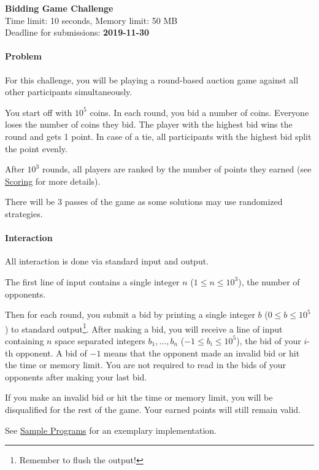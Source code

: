 \documentclass[
    a4paper,
    12pt,
    parskip=half,
    headings=standardclasses,
    footskip=0pt,
    footlines=1,
    headheight=80in
]{scrartcl}
\begin{document}
\begin{center}
    {\LARGE\textbf{Bidding Game Challenge}}\\[6pt]
    Time limit: 10 seconds, Memory limit: 50 MB\\
    {\small Deadline for submissions: \textbf{2019-11-30}}
\end{center}

\paragraph*{Problem}

For this challenge, you will be playing a round-based auction game against all
other participants simultaneously.

You start off with $10^5$ coins. In each round, you bid a number of coins. Everyone loses the number of coins they bid.
The player with the highest bid wins the round and gets 1 point. In case of a tie, all participants with the highest bid
split the point evenly.

After $10^3$ rounds, all players are ranked by the
number of points they earned (see \hyperref[scoring]{Scoring} for more details).

There will be 3 passes of the game as some solutions may use
randomized strategies.

\paragraph*{Interaction} All interaction is done via standard input and output.

The first line of input contains a single integer $n$ ($1 \leq n \leq 10^3$),
the number of opponents.

Then for each round, you submit a bid by printing a single integer $b$ ($0 \leq
    b \leq 10^5$) to standard output\footnote{Remember to flush the output!}. After
making a bid, you will receive a line of input containing $n$ space separated
integers $b_1, \ldots, b_n$ ($-1 \leq b_i \leq 10^5$), the bid of your $i$-th
opponent. A bid of $-1$ means that the opponent made an invalid bid or hit the
time or memory limit. You are not required to read in the bids of your opponents after
making your last bid.

If you make an invalid bid or hit the time or memory limit, you will be
disqualified for the rest of the game. Your earned points will still remain valid.

See \hyperref[sample-programs]{Sample Programs} for an exemplary implementation.
\end{document}
